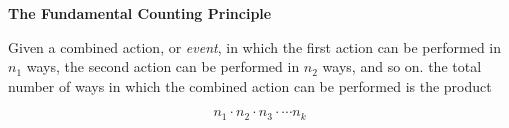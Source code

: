 {\bf The Fundamental Counting Principle}
\vskip 6pt

Given a combined action, or {\it event}, in which the first action can be performed in $n_1$ ways, the second action can be performed in $n_2$ ways, and so on. the total number of ways in which the combined action can be performed is the product

$$n_1\cdot n_2 \cdot n_3 \cdot\cdots n_k$$

\vfill\eject
